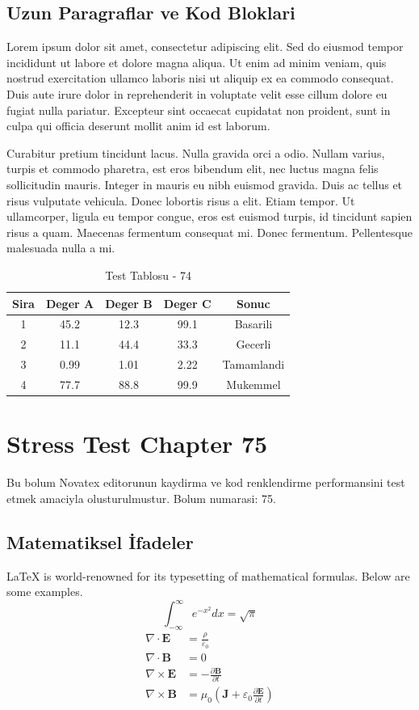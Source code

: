 \documentclass[12pt,a4paper]{article}
\begin{document}
\subsection{Uzun Paragraflar ve Kod Bloklari}
Lorem ipsum dolor sit amet, consectetur adipiscing elit. Sed do eiusmod tempor incididunt ut labore et dolore magna aliqua. Ut enim ad minim veniam, quis nostrud exercitation ullamco laboris nisi ut aliquip ex ea commodo consequat. Duis aute irure dolor in reprehenderit in voluptate velit esse cillum dolore eu fugiat nulla pariatur. Excepteur sint occaecat cupidatat non proident, sunt in culpa qui officia deserunt mollit anim id est laborum.

Curabitur pretium tincidunt lacus. Nulla gravida orci a odio. Nullam varius, turpis et commodo pharetra, est eros bibendum elit, nec luctus magna felis sollicitudin mauris. Integer in mauris eu nibh euismod gravida. Duis ac tellus et risus vulputate vehicula. Donec lobortis risus a elit. Etiam tempor. Ut ullamcorper, ligula eu tempor congue, eros est euismod turpis, id tincidunt sapien risus a quam. Maecenas fermentum consequat mi. Donec fermentum. Pellentesque malesuada nulla a mi.

\begin{table}[h!]
\centering
\begin{tabular}{|c|c|c|c|c|}
\hline
\textbf{Sira} & \textbf{Deger A} & \textbf{Deger B} & \textbf{Deger C} & \textbf{Sonuc} \\
\hline
1 & 45.2 & 12.3 & 99.1 & Basarili \\
2 & 11.1 & 44.4 & 33.3 & Gecerli \\
3 & 0.99 & 1.01 & 2.22 & Tamamlandi \\
4 & 77.7 & 88.8 & 99.9 & Mukemmel \\
\hline
\end{tabular}
\caption{Test Tablosu - 74}
\end{table}

\newpage
\section{Stress Test Chapter 75}
Bu bolum Novatex editorunun kaydirma ve kod renklendirme performansini test etmek amaciyla olusturulmustur. Bolum numarasi: 75.

\subsection{Matematiksel İfadeler}
\LaTeX{} is world-renowned for its typesetting of mathematical formulas. Below are some examples.
\begin{equation}
\int_{-\infty}^{\infty} e^{-x^2} dx = \sqrt{\pi}
\end{equation}
\begin{align}
\nabla \cdot \mathbf{E} &= \frac{\rho}{\varepsilon_0} \\
\nabla \cdot \mathbf{B} &= 0 \\
\nabla \times \mathbf{E} &= -\frac{\partial \mathbf{B}}{\partial t} \\
\nabla \times \mathbf{B} &= \mu_0\left(\mathbf{J} + \varepsilon_0 \frac{\partial \mathbf{E}}{\partial t}\right)
\end{align}
\end{document}
